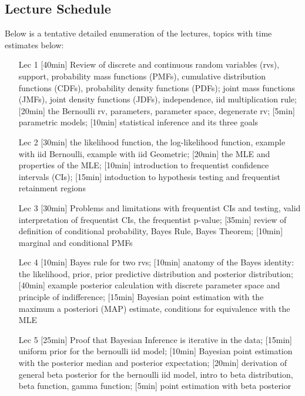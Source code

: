 \subsection*{Lecture Schedule}

Below is a tentative detailed enumeration of the lectures, topics with time estimates below:


\begin{enumerate}
\item[Lec 1] [40min] Review of discrete and continuous random variables (rvs), support, probability mass functions (PMFs), cumulative distribution functions (CDFs), probability density functions (PDFs); joint mass functions (JMFs), joint density functions (JDFs), independence, iid multiplication rule; [20min] the Bernoulli rv, parameters, parameter space, degenerate rv; [5min] parametric models; [10min] statistical inference and its three goals

\item[Lec 2] [30min] the likelihood function, the log-likelihood function, example with iid Bernoulli, example with iid Geometric; [20min] the MLE and properties of the MLE; [10min] introduction to frequentist confidence intervals (CIs); [15min] intoduction to hypothesis testing and frequentist retainment regions

\item[Lec 3] [30min] Problems and limitations with frequentist CIs and testing, valid interpretation of frequentist CIs, the frequentist p-value; [35min] review of definition of conditional probability, Bayes Rule, Bayes Theorem; [10min] marginal and conditional PMFs

\item[Lec 4] [10min] Bayes rule for two rvs; [10min] anatomy of the Bayes identity: the likelihood, prior, prior predictive distribution and posterior distribution; [40min] example posterior calculation with discrete parameter space and principle of indifference; [15min] Bayesian point estimation with the maximum a posteriori (MAP) estimate, conditions for equivalence with the MLE

\item[Lec 5] [25min] Proof that Bayesian Inference is iterative in the data; [15min] uniform prior for the bernoulli iid model; [10min] Bayesian point estimation with the posterior median and posterior expectation; [20min] derivation of general beta posterior for the bernoulli iid model, intro to beta distribution, beta function, gamma function; [5min] point estimation with beta posterior



\end{enumerate}
